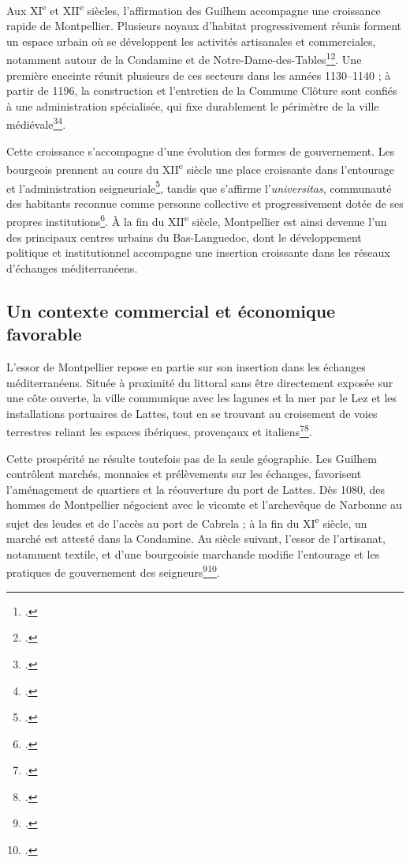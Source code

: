 Aux XI\textsuperscript{e} et XII\textsuperscript{e} siècles, l'affirmation des Guilhem accompagne une croissance rapide de Montpellier. Plusieurs noyaux d'habitat progressivement réunis forment un espace urbain où se développent les activités artisanales et commerciales, notamment autour de la Condamine et de Notre-Dame-des-Tables\footcite{FabreLochard1988}\footcite{Peyron1979}. Une première enceinte réunit plusieurs de ces secteurs dans les années 1130--1140 ; à partir de 1196, la construction et l'entretien de la Commune Clôture sont confiés à une administration spécialisée, qui fixe durablement le périmètre de la ville médiévale\footcite{FabreLochard1988}\footcite{Chastang2013Montpellier}.

Cette croissance s'accompagne d'une évolution des formes de gouvernement. Les bourgeois prennent au cours du XII\textsuperscript{e} siècle une place croissante dans l'entourage et l'administration seigneuriale\footcite{Vergos2021Guilhem}, tandis que s'affirme l'\emph{universitas}, communauté des habitants reconnue comme personne collective et progressivement dotée de ses propres institutions\footcite{Chastang2013Montpellier}. À la fin du XII\textsuperscript{e} siècle, Montpellier est ainsi devenue l'un des principaux centres urbains du Bas-Languedoc, dont le développement politique et institutionnel accompagne une insertion croissante dans les réseaux d'échanges méditerranéens.

\subsection{Un contexte commercial et économique favorable}

L'essor de Montpellier repose en partie sur son insertion dans les échanges méditerranéens. Située à proximité du littoral sans être directement exposée sur une côte ouverte, la ville communique avec les lagunes et la mer par le Lez et les installations portuaires de Lattes, tout en se trouvant au croisement de voies terrestres reliant les espaces ibériques, provençaux et italiens\footcite{FabreLochard1988}\footcite{Galano2021}.

Cette prospérité ne résulte toutefois pas de la seule géographie. Les Guilhem contrôlent marchés, monnaies et prélèvements sur les échanges, favorisent l'aménagement de quartiers et la réouverture du port de Lattes. Dès 1080, des hommes de Montpellier négocient avec le vicomte et l'archevêque de Narbonne au sujet des leudes et de l'accès au port de Cabrela ; à la fin du XI\textsuperscript{e} siècle, un marché est attesté dans la Condamine. Au siècle suivant, l'essor de l'artisanat, notamment textile, et d'une bourgeoisie marchande modifie l'entourage et les pratiques de gouvernement des seigneurs\footcite{FabreLochard1988}\footcite{Vergos2021Guilhem}.

